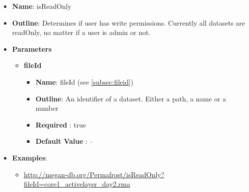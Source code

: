 \documentclass[11pt]{article}
\begin{document}
\begin{itemize}
	\item \textbf{Name}: isReadOnly
	\item \textbf{Outline}: Determines if user has write permissions. Currently all datasets are readOnly, no matter if a user is admin or not.
	\item \textbf{Parameters}
		\begin{itemize}
			\item \textbf{fileId}
				\begin{itemize}
					\item \textbf{Name}: fileId (see \ref{subsec:fileid})
					\item \textbf{Outline}: An identifier of a dataset. Either a path, a name or a number
					\item \textbf{Required} : true
					\item \textbf{Default Value} : --
				\end{itemize}
		\end{itemize}
	\item \textbf{Examples}:
		\begin{itemize}
			\item \url{http://megan-db.org/Permafrost/isReadOnly?fileId=core1_activelayer_day2.rma}
		\end{itemize}
\end{itemize}
\end{document}
